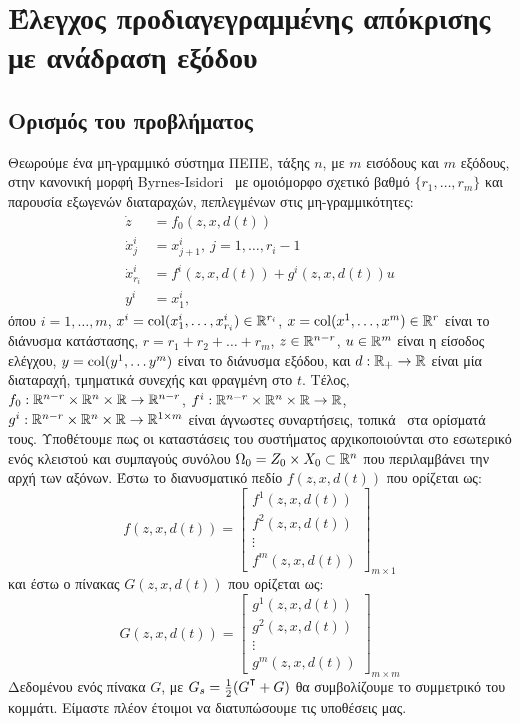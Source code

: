 \chapter[]{Έλεγχος προδιαγεγραμμένης απόκρισης με ανάδραση εξόδου}
\label{chap:ofppc}

\section{Ορισμός του προβλήματος}
Θεωρούμε ένα μη-γραμμικό σύστημα ΠΕΠΕ, τάξης $n$, με $m$ εισόδους και $m$ εξόδους, στην κανονική μορφή \textlatin{Byrnes-Isidori}~\cite{byrnes1991asymptotic, isidori2013nonlinear} με ομοιόμορφο σχετικό βαθμό $\{ r_1, \ldots, r_m \}$ και παρουσία εξωγενών διαταραχών, πεπλεγμένων στις μη-γραμμικότητες:
\begin{subequations}
    \label{eq:sys1}                
    \begin{align}
        \label{eq:sys1_zero_dynamics}
        \dot z &= f_0(z, x, d(t))\\
        \dot x_j^i &= x_{j+1}^i,\ j = 1,\ldots,r_i-1\\
        \dot x_{r_i}^i &= f^i (z,x,d (t)) + g^i (z,x,d (t)) u\\
        y^i &= x_1^i,
    \end{align}
\end{subequations}
όπου $i = 1, \ldots, m$, $x^i = \operatorname{col}(x_1^i, \ldots, x_{r_i}^i) \in \mathbb{R}^{r_i}$, $x = \operatorname{col}(x^1, \ldots, x^m) \in \mathbb{R}^r$ είναι το διάνυσμα κατάστασης, $r = r_1 + r_2 + \ldots + r_m$, $z \in \mathbb{R}^{n-r}$, $u \in \mathbb{R}^m$ είναι η είσοδος ελέγχου, $y = \operatorname{col}(y^1, \ldots y^m)$ είναι το διάνυσμα εξόδου, και $d: \mathbb{R}_+ \rightarrow \mathbb{R}$ είναι μία διαταραχή, τμηματικά συνεχής και φραγμένη στο $t$. Τέλος, $f_0: \mathbb{R}^{n-r}\times \mathbb{R}^n \times \mathbb{R} \rightarrow \mathbb{R}^{n-r}$, $f^i: \mathbb{R}^{n-r}\times \mathbb{R}^n \times \mathbb{R} \rightarrow \mathbb{R}$, $g^i: \mathbb{R}^{n-r}\times \mathbb{R}^n \times \mathbb{R} \rightarrow \mathbb{R}^{1 \times m}$ είναι άγνωστες συναρτήσεις, τοπικά \lip\ στα ορίσματά τους. Υποθέτουμε πως οι καταστάσεις του συστήματος αρχικοποιούνται στο εσωτερικό ενός κλειστού και συμπαγούς συνόλου $\Omega_0 = Z_0 \times X_0 \subset \mathbb{R}^n$ που περιλαμβάνει την αρχή των αξόνων. Έστω το διανυσματικό πεδίο $f(z, x, d(t))$ που ορίζεται ως:
\[
    f(z, x, d(t)) = \begin{bmatrix}
        f^1(z, x, d(t)) \\ f^2(z, x, d(t))\\
        \vdots \\ f^m(z, x, d(t))
    \end{bmatrix}_{m \times 1}
\]
και έστω ο πίνακας $G(z, x, d(t))$ που ορίζεται ως:
\begin{equation}
\label{eq:G}
    G(z, x, d(t)) = \begin{bmatrix}
        g^1(z, x, d(t))\\ g^2(z, x, d(t))\\
        \vdots \\ g^m(z, x, d(t))
    \end{bmatrix}_{m \times m}
\end{equation}
Δεδομένου ενός πίνακα $G$, με $G_s = \frac{1}{2}(G^\T + G)$ θα συμβολίζουμε το συμμετρικό του κομμάτι. Είμαστε πλέον έτοιμοι να διατυπώσουμε τις υποθέσεις μας.

